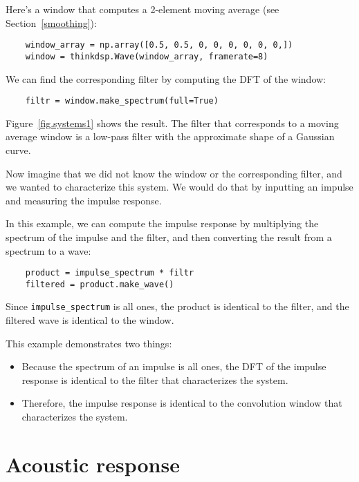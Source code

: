 Here's a window that computes a
2-element moving average (see Section~\ref{smoothing}):

\begin{verbatim}
	window_array = np.array([0.5, 0.5, 0, 0, 0, 0, 0, 0,])
	window = thinkdsp.Wave(window_array, framerate=8)
\end{verbatim}

We can find the corresponding filter by computing the DFT of the
window:

\begin{verbatim}
	filtr = window.make_spectrum(full=True)
\end{verbatim}

Figure~\ref{fig.systems1} shows the result.  The filter that corresponds to a
moving average window is a low-pass filter with the approximate shape
of a Gaussian curve.

Now imagine that we did not know the window or the corresponding filter,
and we wanted to characterize this system.  We would do that by
inputting an impulse and measuring the impulse response.

In this example, we can compute the impulse response by multiplying
the spectrum of the impulse and the filter, and then converting the result
from a spectrum to a wave:

\begin{verbatim}
	product = impulse_spectrum * filtr
	filtered = product.make_wave()
\end{verbatim}

Since \verb"impulse_spectrum" is all ones, the product is
identical to the filter, and the filtered wave is identical to the
window.

This example demonstrates two things:

\begin{itemize}
	
	\item Because the spectrum of an impulse is all ones, the DFT
	of the impulse response is identical to the filter that
	characterizes the system.
	
	\item Therefore, the impulse response is identical to the
	convolution window that characterizes the system.
	
\end{itemize}


\section{Acoustic response}
\label{response}

